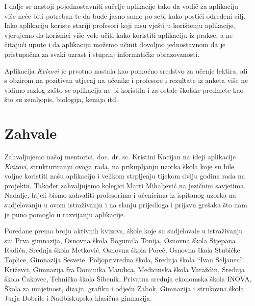 \documentclass[11pt]{scrreprt}
\begin{document}
I dalje se nastoji pojednostavniti sučelje aplikacije tako da vodič za
aplikaciju više neće biti potreban te da bude jasno samo po sebi kako postići
određeni cilj. Iako aplikaciju koriste stariji profesori koji nisu vješti u
korištenju aplikacije, vjerujemo da korisnici više vole učiti kako koristiti
aplikaciju iz prakse, a ne čitajući upute i da aplikaciju možemo učinit
dovoljno jednostavnom da je pristupačna za svaki uzrast i stupanj informatičke
obrazovanosti.

Aplikacija \emph{Kvizovi} je prvotno nastala kao pomoćno sredstvo za učenje
lektira, ali s obzirom na pozitivan utjecaj na učenike i profesore i rezultate
iz anketa više ne vidimo razlog zašto se aplikacija ne bi koristila i za ostale
školske predmete kao što su zemljopis, biologija, kemija itd.

\chapter{Zahvale}

Zahvaljujemo našoj mentorici, doc. dr. sc. Kristini Kocijan na ideji aplikacije
\emph{Kvizovi}, strukturiranju ovoga rada, na prikupljanju uzorka škola koje su
bile voljne koristiti našu aplikaciju i velikom strpljenju tijekom dviju godina
rada na projektu. Također zahvaljujemo kolegici Marti Mihaljević na jezičnim
savjetima. Nadalje, htjeli bismo zahvaliti profesorima i učenicima iz ispitanog
uzorka na sudjelovanju u ovom istraživanju i na slanju prijedloga i prijavu
grešaka što nam je puno pomoglo u razvijanju aplikacije.

Poredane prema broju aktivnih kvizova, škole koje su sudjelovale u istraživanju
su: Prva gimnazija, Osnovna škola Bogumila Tonija, Osnovna škola Stjepana
Radića, Srednja škola Metković, Osnovna škola Poreč, Osnovna škola Stubičke
Toplice, Gimnazija Sesvete, Poljoprivredna škola, Srednja škola ``Ivan
Seljanec'' Križevci, Gimnazija fra Dominika Mandica, Medicinska škola Varaždin,
Srednja škola Čakovec, Tehnička škola Šibenik, Privatna srednja ekonomska škola
INOVA, Škola za umjetnost, dizajn, grafiku i odjeću Zabok, Gimnazija i
strukovna škola Jurja Dobrile i Nadbiskupska klasična gimnazija.

\renewcommand{\listoffigures}{\begingroup
\tocchapter
{}
\endgroup}

\listoffigures

\renewcommand{\bibname}{Popis literature}
\end{document}
